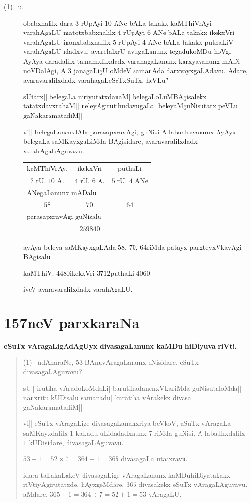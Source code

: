 \begin{description}
\item[{\rm(1)}~ u.] obabxnalilx dara $3$ rUpAyi $10$ ANe bALa takakx
kaMThiVrAyi varahAgaLU matotxbabxnalilx $4$ rUpAyi $6$ ANe bALa takakx
ikekxVri varahAgaLU inonxbabxnalilx $5$ rUpAyi $4$ ANe bALa takakx
puthaLiV varahAgaLU idadxvu. avarelalxrU avugaLanunx tegadukoMDu hoVgi
AyAya daradalilx tamamxlilxdadx varahagaLanunx karxyavanunx mADi
noVDalAgi, A $3$ janagaLigU oMdeV samanAda darxvayxgaLAdavu. Adare,
avaravaralilxdadx varahagaLeSeTxSuTx, heVLu?

sUtarx|| belegaLa niriyutatxdanaM| belegaLoLuMBAgisalekx
tatatxdavxrahaM|| neleyAgirutihudavugaLa| beleyaMguNisutatx peVLu
gaNakaramatadiM|| 

vi|| belegaLanenxlAlx parasapxravAgi, guNisi A labadhxvanunx AyAya
belegaLa saMKayxgaLiMda BAgisidare, avarava\-ralilxdadx
varahAgaLAguvavu.
\begin{center}
\begin{tabular}{ccc}
kaMThiVrAyi & ikekxVri & puthaLi\\[2pt]
$3$ rU. $10$ A. & $4$ rU. $6$ A. & $5$ rU. $4$ ANe\\[4pt]
\multicolumn{3}{l}{ANegaLanunx mADalu}\\[2pt]
 $58$ & $70$ & $64$\\[4pt]
\multicolumn{3}{l}{parasapxravAgi guNisalu}\\[2pt]
 & $259840$ & 
\end{tabular}
\end{center}

ayAya beleya saMKayxgaLAda $58$, $70$, $64$riMda patayx
parxteyxVkavAgi BAgisalu 

kaMThiV. $4480$\qquad ikekxVri $3712$\qquad puthaLi $4060$

iveV avaravaralilxdadx varahAgaLU.
\end{description}


\chapter{157neV parxkaraNa}

\begin{center}
{\large\bf eSuTx vAragaLigAdAgUyx divasagaLanunx kaMDu hiDiyuva riVti.}
\end{center}

\begin{verse}
{\rm(1)}~ udAharaNe, $53$ BAnuvAragaLanunx eNisidare, eSuTx
divasagaLAguvavu? 

sU|| irutiha vAradoLoMdaLi| barutihadanenxVLariMda guNisutaloMda||
nanxritu kUDisalu samanadu| kuratiha vArakekx divasa gaNakaramatadiM||

vi|| eSuTx vAragaLige divasagaLananxriya beVkoV, aSuTx vAragaLa
saMKayxdalilx $1$ kaLadu uLidadadxnunx $7$ riMda guNisi, A
labadhxdalilx $1$ kUDisidare, divasagaLAguvavu.

$53-1=52\times 7=364+1=365$ divasagaLu utatxravu.

idara taLakaLakeV divasagaLige vAragaLanunx kaMDuhiDiyatakakx
riVtiyAgirutatxde, hAyxgeMdare, $365$ divasakekx eSuTx
vAragaLAguvavu. aMdare, $365-1=364\div 7=52+1=53$ vAragaLU.
\end{verse}



